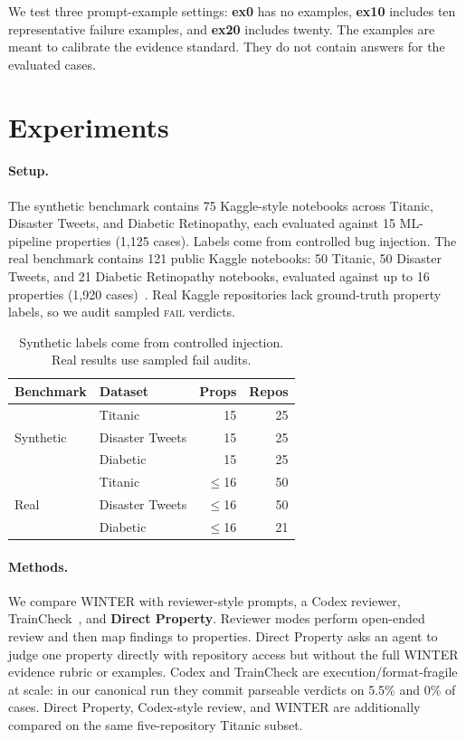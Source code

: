 \documentclass[11pt]{article}
\newcommand{\fail}{\textsc{fail}}
\newcommand{\vibetest}{\textsc{WINTER}}
\begin{document}
We test three prompt-example settings: \textbf{ex0} has no examples,
\textbf{ex10} includes ten representative failure examples, and \textbf{ex20}
includes twenty.
The examples are meant to calibrate the evidence standard.
They do not contain answers for the evaluated cases.

\section{Experiments}
\label{sec:experiments}

\paragraph{Setup.}
The synthetic benchmark contains 75 Kaggle-style notebooks across Titanic,
Disaster Tweets, and Diabetic Retinopathy, each evaluated against 15
ML-pipeline properties (1,125 cases).
Labels come from controlled bug injection.
The real benchmark contains 121 public Kaggle notebooks: 50 Titanic, 50
Disaster Tweets, and 21 Diabetic Retinopathy notebooks, evaluated against up to
16 properties (1,920 cases)~\citep{kaggle_titanic,kaggle_disaster_tweets,
kaggle_diabetic_retinopathy}.
Real Kaggle repositories lack ground-truth property labels, so we audit sampled
\fail{} verdicts.

\begin{table}[t]
  \centering
  \small
  \begin{tabular}{llrr}
    \toprule
    Benchmark & Dataset & Props & Repos \\
    \midrule
    \multirow{3}{*}{Synthetic} & Titanic & 15 & 25 \\
     & Disaster Tweets & 15 & 25 \\
     & Diabetic & 15 & 25 \\
    \midrule
    \multirow{3}{*}{Real} & Titanic & $\le$16 & 50 \\
     & Disaster Tweets & $\le$16 & 50 \\
     & Diabetic & $\le$16 & 21 \\
    \bottomrule
  \end{tabular}
  \caption{Synthetic labels come from controlled injection. Real results use
  sampled fail audits.}
  \label{tab:datasets}
\end{table}

\paragraph{Methods.}
We compare \vibetest{} with reviewer-style prompts, a Codex reviewer,
TrainCheck~\citep{traincheck}, and \textbf{Direct Property}.
Reviewer modes perform open-ended review and then map findings to properties.
Direct Property asks an agent to judge one property directly with repository
access but without the full \vibetest{} evidence rubric or examples.
Codex and TrainCheck are execution/format-fragile at scale: in our canonical
run they commit parseable verdicts on 5.5\% and 0\% of cases.
Direct Property, Codex-style review, and \vibetest{} are additionally compared
on the same five-repository Titanic subset.
\end{document}
